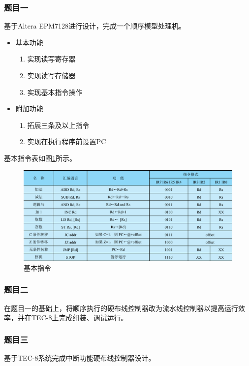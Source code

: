 \newpage
\subsubsection{题目一}

基于Altera EPM7128进行设计，完成一个顺序模型处理机。
\begin{itemize}
    \item 基本功能
    \begin{enumerate}
        \item 实现读写寄存器
        \item 实现读写存储器
        \item 实现基本指令操作
    \end{enumerate}
    \item 附加功能
    \begin{enumerate}
        \item 拓展三条及以上指令
        \item 实现在执行程序前设置PC
    \end{enumerate}
\end{itemize}

基本指令表如图\ref{fig:instruction}所示。

\begin{figure}[htbp]
    \centering
    \includegraphics[width=0.9\linewidth]{figures/chapter1/instruction.png}
    \caption{基本指令}
    \label{fig:instruction}
\end{figure}

\subsubsection{题目二}
在题目一的基础上，将顺序执行的硬布线控制器改为流水线控制器以提高运行效率，并在TEC-8上完成组装、调试运行。

\subsubsection{题目三}
基于TEC-8系统完成中断功能硬布线控制器设计。


